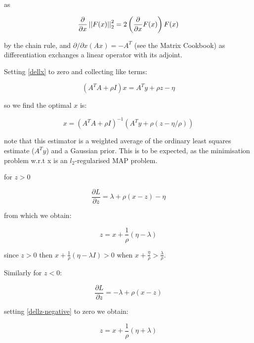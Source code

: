 \documentclass{article}
\begin{document}
as 

\begin{equation}
\frac{\partial}{\partial x} \left|\left|F(x)\right|\right|_2^2 = 2\left(\frac{\partial}{\partial x} F(x)\right) F(x) 
\label{dellx}
\end{equation}

by the chain rule, and \(\partial/\partial x (Ax) = -A^T\) (see the Matrix Cookbook) as differentiation exchanges a linear operator with its adjoint.

Setting \eqref{dellx} to zero and collecting like terms:

\begin{equation}
\left(A^TA + \rho I\right)x = A^Ty + \rho z - \eta
\end{equation}

so we find the optimal \(x\) is:

\begin{equation}
x = \left(A^T A + \rho I\right)^{-1}\left(A^Ty + \rho \left( z - \eta/\rho\right)\right)
\label{optx}
\end{equation}

note that this estimator is a weighted average of the ordinary least squares estimate (\(A^Ty\)) and a Gaussian prior. This is to be expected, as the minimisation problem w.r.t x is an \(l_2\)-regularised MAP problem.

for \(z > 0\)

\begin{equation}
\frac{\partial L} {\partial z} = \lambda + \rho (x-z) - \eta
\label{dellz-positive}
\end{equation}

from which we obtain:

\begin{equation*}
z = x + \frac{1}{\rho} ( \eta - \lambda )
\end{equation*}

since \(z>0\) then \(x + \frac{1}{\rho} ( \eta - \lambda I) > 0\) when \(x + \frac{\eta}{\rho} > \frac{\lambda}{\rho}\).

Similarly for \(z < 0\):

\begin{equation}
\frac{\partial L} {\partial z} = -\lambda + \rho (x-z) 
\label{dellz-negative}
\end{equation}

setting \eqref{dellz-negative} to zero we obtain:

\begin{equation*}
z = x + \frac{1}{\rho}(\eta + \lambda)
\end{equation*}
\end{document}
